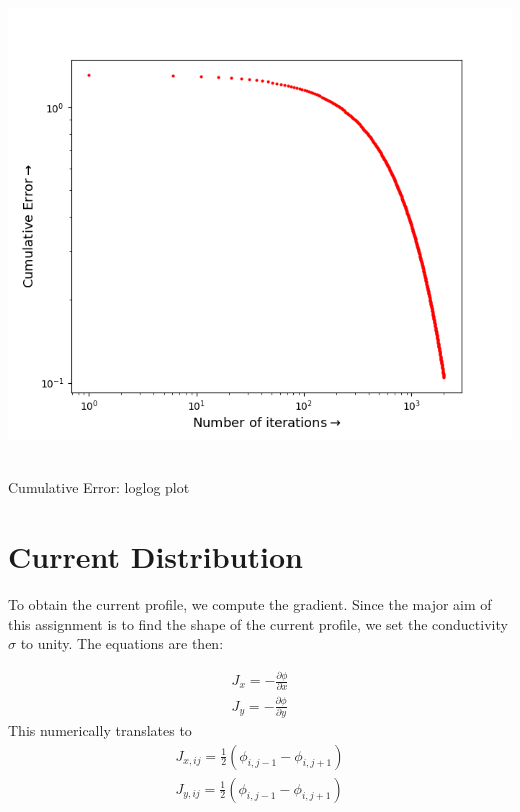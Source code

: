 \documentclass[12pt, a4paper]{report}
\begin{document}
\begin{center}
	\includegraphics[scale=0.65]{Figure9} 
	\caption{\\Cumulative Error: loglog plot}
	\label{fig:rawdata}
\end{center}

\section*{Current Distribution}
To obtain the current profile, we compute the gradient. Since the major aim of this assignment is to find the shape of the current profile, we set the conductivity $\sigma$ to unity. The equations are then:

\begin{align*}
J_x = -\frac{\partial\phi}{\partial x} \\
J_y = -\frac{\partial\phi}{\partial y}
\end{align*}
This numerically translates to 
\begin{align*}
J_{x,ij} = \frac{1}{2}(\phi_{i,j-1} - \phi_{i,j+1}) \\
J_{y,ij} = \frac{1}{2}(\phi_{i,j-1} - \phi_{i,j+1})
\end{align*}
\end{document}
